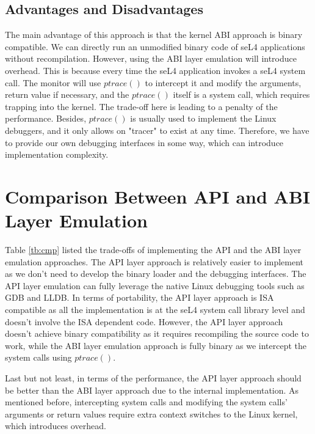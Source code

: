 \subsection{Advantages and Disadvantages}
The main advantage of this approach is that the kernel ABI approach is binary compatible. We can directly run an unmodified binary code of seL4 applications without recompilation. However, using the ABI layer emulation will introduce overhead. This is because every time the seL4 application invokes a seL4 system call. The monitor will use $ptrace()$ to intercept it and modify the arguments, return value if necessary, and the $ptrace()$ itself is a system call, which requires trapping into the kernel. The trade-off here is leading to a penalty of the performance. Besides, $ptrace()$ is usually used to implement the Linux debuggers, and it only allows on "tracer" to exist at any time. Therefore, we have to provide our own debugging interfaces in some way, which can introduce implementation complexity.  

\section{Comparison Between API and ABI Layer Emulation}

Table \ref{tb:cmp} listed the trade-offs of implementing the API and the ABI layer emulation approaches. The API layer approach is relatively easier to implement as we don't need to develop the binary loader and the debugging interfaces. The API layer emulation can fully leverage the native Linux debugging tools such as GDB and LLDB. In terms of portability, the API layer approach is ISA compatible as all the implementation is at the seL4 system call library level and doesn't involve the ISA dependent code. However, the API layer approach doesn't achieve binary compatibility as it requires recompiling the source code to work, while the ABI layer emulation approach is fully binary as we intercept the system calls using $ptrace()$.

Last but not least, in terms of the performance, the API layer approach should be better than the ABI layer approach due to the internal implementation. As mentioned before, intercepting system calls and modifying the system calls' arguments or return values require extra context switches to the Linux kernel, which introduces overhead.

